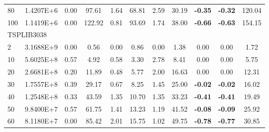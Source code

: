{\begin{longtable}{@{}llccccccccc@{}}
\multicolumn{1}{l|}{80}  & \multicolumn{1}{l|}{1.4207E+6}  & 0.00 & \multicolumn{1}{c|}{97.61}   & 1.64 & \multicolumn{1}{c|}{68.81}   & 2.59 & \multicolumn{1}{c|}{30.19}   & \textbf{-0.35} & \textbf{-0.32} & 120.04  \\
\multicolumn{1}{l|}{100} & \multicolumn{1}{l|}{1.1419E+6}  & 0.00 & \multicolumn{1}{c|}{122.92}  & 0.81 & \multicolumn{1}{c|}{93.69}   & 1.74 & \multicolumn{1}{c|}{38.00}   & \textbf{-0.66} & \textbf{-0.63} & 154.15  \\ \hline
\multicolumn{11}{l}{TSPLIB3038}                                                                                                                                                                                          \\ \hline
\multicolumn{1}{l|}{2}   & \multicolumn{1}{l|}{3.1688E+9}  & 0.00 & \multicolumn{1}{c|}{0.56}    & 0.00 & \multicolumn{1}{c|}{0.86}    & 0.00 & \multicolumn{1}{c|}{1.38}    & 0.00           & 0.00           & 1.72    \\
\multicolumn{1}{l|}{10}  & \multicolumn{1}{l|}{5.6025E+8}  & 0.57 & \multicolumn{1}{c|}{4.92}    & 0.58 & \multicolumn{1}{c|}{3.30}    & 2.78 & \multicolumn{1}{c|}{8.41}    & 0.00           & 0.00           & 5.75    \\
\multicolumn{1}{l|}{20}  & \multicolumn{1}{l|}{2.6681E+8}  & 0.20 & \multicolumn{1}{c|}{11.89}   & 0.48 & \multicolumn{1}{c|}{5.77}    & 2.00 & \multicolumn{1}{c|}{16.63}   & 0.00           & 0.00           & 12.31   \\
\multicolumn{1}{l|}{30}  & \multicolumn{1}{l|}{1.7557E+8}  & 0.39 & \multicolumn{1}{c|}{29.17}   & 0.67 & \multicolumn{1}{c|}{8.25}    & 1.45 & \multicolumn{1}{c|}{25.00}   & \textbf{-0.02} & \textbf{-0.02} & 16.02   \\
\multicolumn{1}{l|}{40}  & \multicolumn{1}{l|}{1.2548E+8}  & 0.33 & \multicolumn{1}{c|}{43.59}   & 1.35 & \multicolumn{1}{c|}{10.70}   & 1.35 & \multicolumn{1}{c|}{33.23}   & \textbf{-0.41} & \textbf{-0.41} & 19.49   \\
\multicolumn{1}{l|}{50}  & \multicolumn{1}{l|}{9.8400E+7}  & 0.57 & \multicolumn{1}{c|}{61.75}   & 1.41 & \multicolumn{1}{c|}{13.23}   & 1.19 & \multicolumn{1}{c|}{41.52}   & \textbf{-0.08} & \textbf{-0.09} & 25.92   \\
\multicolumn{1}{l|}{60}  & \multicolumn{1}{l|}{8.1180E+7}  & 0.00 & \multicolumn{1}{c|}{85.42}   & 2.01 & \multicolumn{1}{c|}{15.75}   & 1.02 & \multicolumn{1}{c|}{49.75}   & \textbf{-0.78} & \textbf{-0.77} & 30.85   \\

\end{longtable}}
